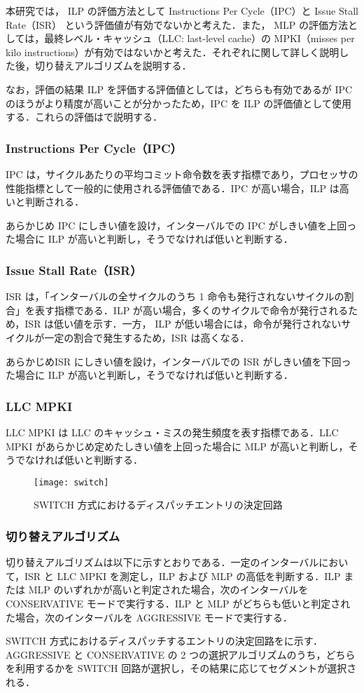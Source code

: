 本研究では， ILP の評価方法として Instructions Per Cycle（IPC）と Issue Stall Rate（ISR） という評価値が有効でないかと考えた．また， MLP の評価方法としては，最終レベル・キャッシュ（LLC: last-level cache）の MPKI（misses per kilo instructions）が有効ではないかと考えた．それぞれに関して詳しく説明した後，切り替えアルゴリズムを説明する．

なお，評価の結果 ILP を評価する評価値としては，どちらも有効であるが IPC のほうがより精度が高いことが分かったため，IPC を ILP の評価値として使用する．これらの評価はで説明する．

\subsubsection{Instructions Per Cycle（IPC）}
IPC は，サイクルあたりの平均コミット命令数を表す指標であり，プロセッサの性能指標として一般的に使用される評価値である．IPC が高い場合，ILP は高いと判断される．

あらかじめ IPC にしきい値を設け，インターバルでの IPC がしきい値を上回った場合に ILP が高いと判断し，そうでなければ低いと判断する．

\subsubsection{Issue Stall Rate（ISR）}
ISR は，「インターバルの全サイクルのうち 1 命令も発行されないサイクルの割合」を表す指標である．ILP が高い場合，多くのサイクルで命令が発行されるため，ISR は低い値を示す．一方， ILP が低い場合には，命令が発行されないサイクルが一定の割合で発生するため，ISR は高くなる．

あらかじめISR にしきい値を設け，インターバルでの ISR がしきい値を下回った場合に ILP が高いと判断し，そうでなければ低いと判断する．

\subsubsection{LLC MPKI}
LLC MPKI は LLC のキャッシュ・ミスの発生頻度を表す指標である．LLC MPKI があらかじめ定めたしきい値を上回った場合に MLP が高いと判断し，そうでなければ低いと判断する．

\begin{figure}[htb]
  \centering
  \texttt{[image: switch]}
  \caption{SWITCH 方式におけるディスパッチエントリの決定回路}
  \label{fig:switch}
\end{figure}

\subsubsection{切り替えアルゴリズム}
切り替えアルゴリズムは以下に示すとおりである．一定のインターバルにおいて，ISR と LLC MPKI を測定し，ILP および MLP の高低を判断する．ILP または MLP のいずれかが高いと判定された場合，次のインターバルを CONSERVATIVE モードで実行する．ILP と MLP がどちらも低いと判定された場合，次のインターバルを AGGRESSIVE モードで実行する．

SWITCH 方式におけるディスパッチするエントリの決定回路をに示す．AGGRESSIVE と CONSERVATIVE の 2 つの選択アルゴリズムのうち，どちらを利用するかを SWITCH 回路が選択し，その結果に応じてセグメントが選択される．

